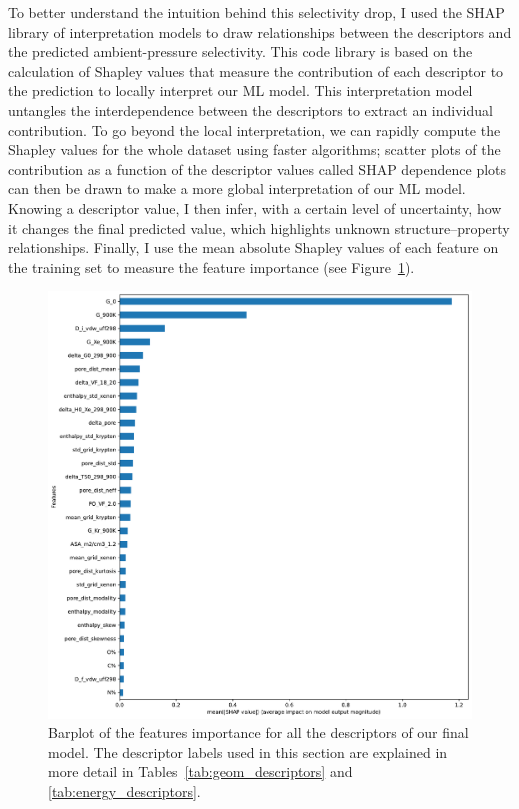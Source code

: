 \documentclass[main]{subfiles}
\begin{document}
To better understand the intuition behind this selectivity drop, I used the SHAP\autocite{SHAP,molnar2020interpretable} library of interpretation models to draw relationships between the descriptors and the predicted ambient-pressure selectivity. This code library is based on the calculation of Shapley values\autocite{shapley1953value} that measure the contribution of each descriptor to the prediction to locally interpret our ML model. This interpretation model untangles the interdependence between the descriptors to extract an individual contribution. To go beyond the local interpretation, we can rapidly compute the Shapley values for the whole dataset using faster algorithms;\autocite{SHAP} scatter plots of the contribution as a function of the descriptor values called SHAP dependence plots can then be drawn to make a more global interpretation of our ML model. Knowing a descriptor value, I then infer, with a certain level of uncertainty, how it changes the final predicted value, which highlights unknown structure--property relationships. Finally, I use the mean absolute Shapley values of each feature on the training set to measure the feature importance (see Figure~\ref{fgr:featimp_shap}).

\begin{figure}[ht]
  \centering
    \includegraphics[width=0.70\linewidth]{figures/4-ml/SI_figure/Feature_importance_shapbased.pdf}
    \caption{Barplot of the features importance for all the descriptors of our final model. The descriptor labels used in this section are explained in more detail in Tables~\ref{tab:geom_descriptors} and \ref{tab:energy_descriptors}.}\label{fgr:featimp_shap}
  \end{figure}
\end{document}
